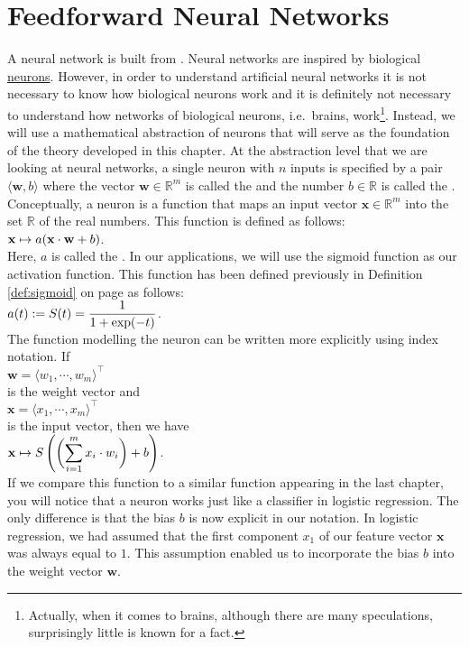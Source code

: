 \section{Feedforward Neural Networks}
A neural network is built from .  Neural networks are inspired by biological 
\href{https://en.wikipedia.org/wiki/Neuron}{neurons}.  However, in order to understand artificial neural
networks it is not necessary to know how biological neurons work and it is definitely not necessary to
understand how networks of biological neurons, i.e.~brains, work\footnote{
  Actually, when it comes to brains, although there are many speculations, surprisingly little is known for a fact.  
}.  
Instead, we will use a mathematical abstraction of neurons that will serve as the foundation of the theory
developed in this chapter.  At the abstraction level that we are looking at neural networks, a single neuron
with $n$ inputs is specified by a pair $\langle \mathbf{w}, b\rangle$ where the vector $\mathbf{w} \in \mathbb{R}^m$ is called the  and 
the number $b \in \mathbb{R}$ is called the .   
Conceptually, a neuron is a function that maps an input vector $\mathbf{x} \in \mathbb{R}^m$ into the set
$\mathbb{R}$ of the real numbers.  This function is defined as follows: 
\\[0.2cm]
\hspace*{1.3cm}
$\displaystyle \mathbf{x} \mapsto a(\mathbf{x} \cdot \mathbf{w} + b)$.
\\[0.2cm]
Here, $a$ is called the .  In our applications, we will use the sigmoid
function as our activation function.  This function has been defined previously in Definition \ref{def:sigmoid}
on page \pageref{def:sigmoid} as follows:
\\[0.2cm]
\hspace*{1.3cm}
$\displaystyle a(t) := S(t) = \frac{1}{1 + \exp(-t)}$.
\\[0.2cm]
The function modelling the neuron can be written more explicitly using index notation.  If
\\[0.2cm]
\hspace*{1.3cm}
$\mathbf{w} = \langle w_1, \cdots, w_m \rangle^\top$ 
\\[0.2cm]
is the weight vector and 
\\[0.2cm]
\hspace*{1.3cm}
$\mathbf{x} = \langle x_1, \cdots, x_m \rangle^\top$
\\[0.2cm]
is the input vector, then we have
\\[0.2cm]
\hspace*{1.3cm}
$\displaystyle \mathbf{x} \mapsto S\left(\biggl(\sum\limits_{i=1}^m x_i \cdot w_i\biggr) + b\right)$.
\\[0.2cm]
If we compare this function to a similar function appearing in the last chapter, you will notice 
that a neuron works just like a classifier in logistic regression.  The only difference is that the bias $b$
is now explicit in our notation.  In logistic regression, we had assumed that the first component $x_1$ of our
feature vector $\mathbf{x}$ was always equal to $1$.  This assumption enabled us to incorporate the bias $b$ into the
weight vector $\mathbf{w}$.

